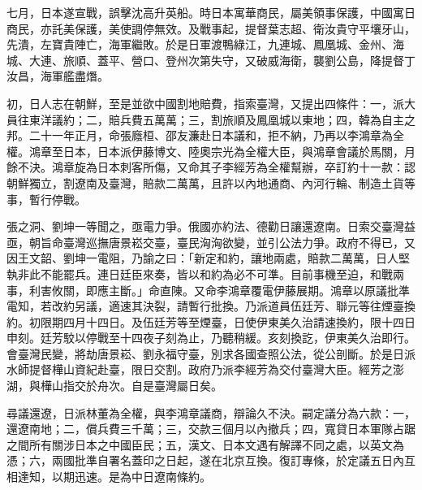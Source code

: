 \begin{pinyinscope}
七月，日本遂宣戰，誤擊沈高升英船。時日本寓華商民，屬美領事保護，中國寓日商民，亦託美保護，美使調停無效。及戰事起，提督葉志超、衛汝貴守平壤牙山，先潰，左寶貴陣亡，海軍繼敗。於是日軍渡鴨綠江，九連城、鳳凰城、金州、海城、大連、旅順、蓋平、營口、登州次第失守，又破威海衛，襲劉公島，降提督丁汝昌，海軍艦盡熸。

初，日人志在朝鮮，至是並欲中國割地賠費，指索臺灣，又提出四條件：一，派大員往東洋議約；二，賠兵費五萬萬；三，割旅順及鳳凰城以東地；四，韓為自主之邦。二十一年正月，命張廕桓、邵友濂赴日本議和，拒不納，乃再以李鴻章為全權。鴻章至日本，日本派伊藤博文、陸奧宗光為全權大臣，與鴻章會議於馬關，月餘不決。鴻章旋為日本刺客所傷，又命其子李經芳為全權幫辦，卒訂約十一款：認朝鮮獨立，割遼南及臺灣，賠款二萬萬，且許以內地通商、內河行輪、制造土貨等事，暫行停戰。

張之洞、劉坤一等聞之，亟電力爭。俄國亦約法、德勸日讓還遼南。日索交臺灣益亟，朝旨命臺灣巡撫唐景崧交臺，臺民洶洶欲變，並引公法力爭。政府不得已，又因王文韶、劉坤一電阻，乃諭之曰：「新定和約，讓地兩處，賠款二萬萬，日人堅執非此不能罷兵。連日廷臣來奏，皆以和約為必不可準。目前事機至迫，和戰兩事，利害攸關，即應主斷。」命直陳。又命李鴻章覆電伊藤展期。鴻章以原議批準電知，若改約另議，適速其決裂，請暫行批換。乃派道員伍廷芳、聯元等往煙臺換約。初限期四月十四日。及伍廷芳等至煙臺，日使伊東美久治請速換約，限十四日申刻。廷芳駮以停戰至十四夜子刻為止，乃聽稍緩。亥刻換訖，伊東美久治即行。會臺灣民變，將劫唐景崧、劉永福守臺，別求各國查照公法，從公剖斷。於是日派水師提督樺山資紀赴臺，限日交割。政府乃派李經芳為交付臺灣大臣。經芳之澎湖，與樺山指交於舟次。自是臺灣屬日矣。

尋議還遼，日派林董為全權，與李鴻章議商，辯論久不決。嗣定議分為六款：一，還遼南地；二，償兵費三千萬；三，交款三個月以內撤兵；四，寬貸日本軍隊占踞之間所有關涉日本之中國臣民；五，漢文、日本文遇有解譯不同之處，以英文為憑；六，兩國批準自署名蓋印之日起，遂在北京互換。復訂專條，於定議五日內互相達知，以期迅速。是為中日遼南條約。


\end{pinyinscope}
